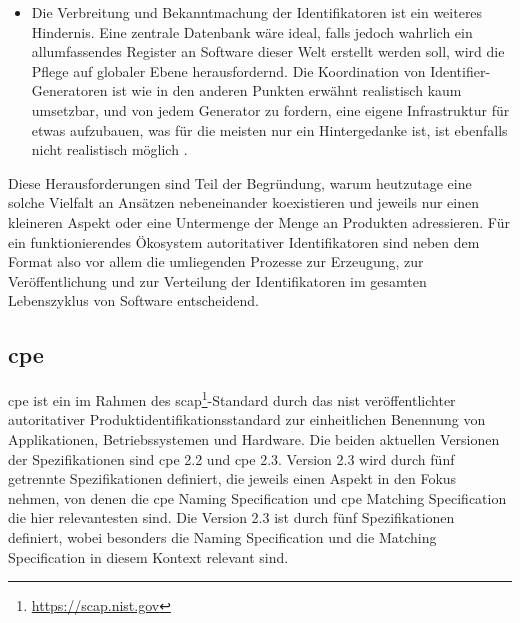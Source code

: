 \begin{itemize}
    \item Die Verbreitung und Bekanntmachung der Identifikatoren ist ein weiteres Hindernis.
    Eine zentrale Datenbank wäre ideal, falls jedoch wahrlich ein allumfassendes Register an Software dieser Welt erstellt werden soll, wird die Pflege auf globaler Ebene herausfordernd.
    Die Koordination von Identifier-Generatoren ist wie in den anderen Punkten erwähnt realistisch kaum umsetzbar, und von jedem Generator zu fordern, eine eigene Infrastruktur für etwas aufzubauen, was für die meisten nur ein Hintergedanke ist, ist ebenfalls nicht realistisch möglich \autocite{CISA2023}.
\end{itemize}

Diese Herausforderungen sind Teil der Begründung, warum heutzutage eine solche Vielfalt an Ansätzen nebeneinander koexistieren und jeweils nur einen kleineren Aspekt oder eine Untermenge der Menge an Produkten adressieren.
Für ein funktionierendes Ökosystem autoritativer Identifikatoren sind neben dem Format also vor allem die umliegenden Prozesse zur Erzeugung, zur Veröffentlichung und zur Verteilung der Identifikatoren im gesamten Lebenszyklus von Software entscheidend.

\subsection{\acrfull{cpe}}\label{subsec:cpe-description}


\acrshort{cpe} ist ein im Rahmen des \acrfull{scap}\footnote{\url{https://scap.nist.gov}}-Standard durch das \acrshort{nist} veröffentlichter autoritativer Produktidentifikationsstandard zur einheitlichen Benennung von Applikationen, Betriebssystemen und Hardware.
Die beiden aktuellen Versionen der Spezifikationen sind \acrshort{cpe} 2.2 und \acrshort{cpe} 2.3.
Version 2.3 wird durch fünf getrennte Spezifikationen definiert, die jeweils einen Aspekt in den Fokus nehmen, von denen die \acrshort{cpe} Naming Specification \autocite{Cheikes_Waltermire_Scarfone_2011} und \acrshort{cpe} Matching Specification \autocite{Parmelee_Booth_Waltermire_Scarfone_2011} die hier relevantesten sind.
Die Version 2.3 ist durch fünf Spezifikationen definiert, wobei besonders die Naming Specification \autocite{Cheikes_Waltermire_Scarfone_2011} und die Matching Specification \autocite{Parmelee_Booth_Waltermire_Scarfone_2011} in diesem Kontext relevant sind.

